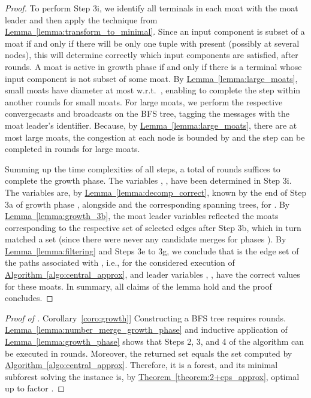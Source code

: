 \documentclass[letterpaper,11pt]{article}
\newcommand{\namedref}[2]{\hyperref[#2]{#1~\ref*{#2}}}
\newcommand{\theoremref}[1]{\namedref{Theorem}{#1}}
\newcommand{\lemmaref}[1]{\namedref{Lemma}{#1}}
\newcommand{\corollaryref}[1]{\namedref{Corollary}{#1}}
\newcommand{\algref}[1]{\namedref{Algorithm}{#1}}
\begin{document}
\begin{proof}
To perform Step 3i, we identify all terminals in each moat with the moat leader
and then apply the technique from \lemmaref{lemma:transform_to_minimal}. Since
an input component  is subset of a moat if and only if there
will be only one tuple  with  present
(possibly at several nodes), this will determine correctly which input
components are satisfied, after  rounds. A moat is
active in growth phase  if and only if there is a terminal whose input
component is not subset of some moat. By \lemmaref{lemma:large_moats}, small
moats have diameter at most  w.r.t.\ , enabling to complete the
step within another  rounds for small moats. For large moats, we
perform the respective convergecasts and broadcasts on the BFS tree, tagging
the messages with the moat leader's identifier. Because, by
\lemmaref{lemma:large_moats}, there are at most  large moats, the
congestion at each node is bounded by  and the step can be
completed in  rounds for large moats.

Summing up the time complexities of all steps, a total of 
rounds suffices to complete the growth phase. The variables
, , have been determined in Step 3i. The variables
 are, by \lemmaref{lemma:decomp_correct}, known by the end of
Step 3a of growth phase , alongside  and the corresponding
spanning trees, for . By \lemmaref{lemma:growth_3b},
the moat leader variables reflected the moats corresponding to the respective
set of selected edges  after Step 3b, which in turn matched a set
 (since there were never any
candidate merges for phases ). By \lemmaref{lemma:filtering} and
Steps 3e to 3g, we conclude that  is the edge set of the paths associated
with , i.e.,  for the
considered execution of \algref{algo:central_approx}, and leader variables
, , have the correct values for these moats. In summary, all
claims of the lemma hold and the proof concludes.
\end{proof}


\begin{proof}[Proof of \corollaryref{coro:growth}]
Constructing a BFS tree requires  rounds.
\lemmaref{lemma:number_merge_growth_phase} and inductive application of
\lemmaref{lemma:growth_phase} shows that Steps 2, 3, and 4 of the algorithm can
be executed in  rounds.
Moreover, the returned set  equals the set  computed by
\algref{algo:central_approx}. Therefore, it is a forest, and its minimal
subforest solving the instance is, by \theoremref{theorem:2+eps_approx}, optimal
up to factor .
\end{proof}
\end{document}
